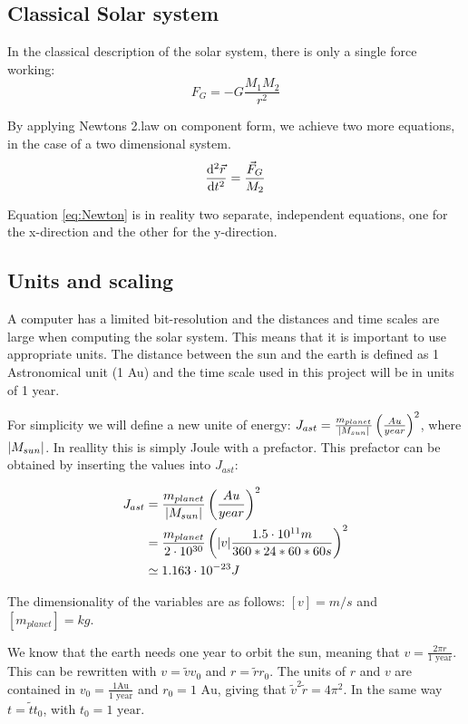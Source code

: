 
\subsection{Classical Solar system}
In the classical description of the solar system, there is only a single force working:
\begin{equation}
 F_G = - G\frac{M_{1}M_2}{r ^2} \label{eq:F_G}
\end{equation}

By applying Newtons 2.law on component form, we achieve two more equations, in the case of a two dimensional system. 
\begin{equation}
\dv[2]{\vec{r	}}{t} = \frac{\vec{F}_G}{M_2} \label{eq:Newton}
\end{equation}

Equation \ref{eq:Newton} is in reality two separate, independent equations, one for the x-direction and the other for the y-direction. 
 
 
  
\subsection{Units and scaling}

A computer has a limited bit-resolution and the distances and time scales are large when computing the solar system. This means that it is important to use appropriate units. The distance between the sun and the earth is defined as 1 Astronomical unit (1 Au) and the time scale used in this project will be in units of 1 year. 


For simplicity we will define a new unite of energy: $ J_{ast}  = \frac{m_{planet}}{\abs{M_{sun}}} \left(\frac{Au}{year}\right)^2$, where $ \abs{M_{sun}} $. In reallity this is simply Joule with a prefactor. This prefactor can be obtained by inserting the values into $ J_{ast} $:
	
	\begin{align}
J_{ast}  &= \frac{m_{planet}}{\abs{M_{sun}}}\left(\frac{Au}{year}\right)^2\\
&= \frac{m_{planet}}{2\cdot 10^{30}}	\left(\abs{v}	\frac{1.5 \cdot 10^{11}m}{360*24*60*60 s}\right)^2\\
&\simeq 1.163\cdot 10^{-23} J
\end{align}

The dimensionality of the variables are as follows:  $ [v] = m/s $ and $ [m_{planet}] = kg $.
	



We know that the earth needs one year to orbit the sun, meaning that $ v = \frac{2\pi r}{\text{1 year}} $. This can be rewritten with $ v = \tilde{v}v_0 $ and $ r = \tilde{r}r_0 $. The units of $ r $ and $ v $ are contained in  $ v_0 = \frac{1 \text{Au}}{1 \text{ year}} $ and $ r_0=1\text{ Au} $, giving that $ \tilde{v}^2\tilde{r} = 4\pi^2 $. In the same way $ t = \tilde{t}t_0 $, with $ t_0 = 1 \text{ year} $. 


